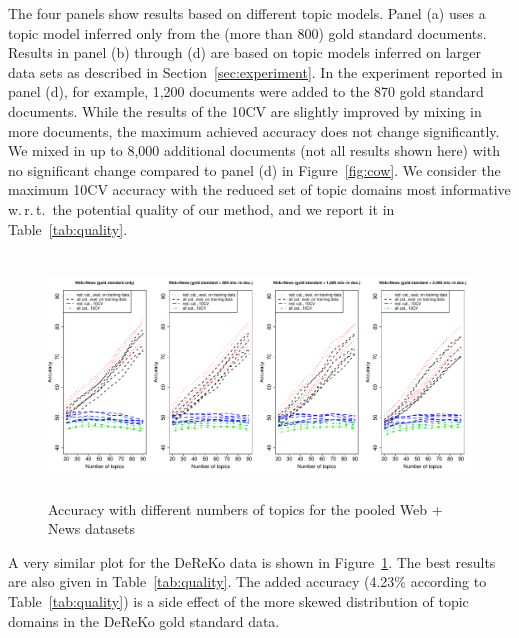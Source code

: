 \documentclass[11pt]{article}
\begin{document}
The four panels show results based on different topic models.
Panel (a) uses a topic model inferred only from the (more than 800) gold standard documents.
Results in panel (b) through (d) are based on topic models inferred on larger data sets as described in Section~\ref{sec:experiment}.
In the experiment reported in panel (d), for example, 1,200 documents were added to the 870 gold standard documents.
While the results of the 10CV are slightly improved by mixing in more documents, the maximum achieved accuracy does not change significantly.
We mixed in up to 8,000 additional documents (not all results shown here) with no significant change compared to panel (d) in Figure~\ref{fig:cow}.
We consider the maximum 10CV accuracy with the reduced set of topic domains most informative w.\,r.\,t.\ the potential quality of our method, and we report it in Table~\ref{tab:quality}.


\begin{figure}[!ht]
  \centering
  \includegraphics[width=\textwidth, height=6.4cm]{graphics/coreko.pdf}
  \caption{Accuracy with different numbers of topics for the pooled Web + News datasets}
  \label{fig:coreko}
\end{figure}

A very similar plot for the DeReKo data is shown in Figure~\ref{fig:coreko}.
The best results are also given in Table~\ref{tab:quality}.
The added accuracy (4.23\% according to Table~\ref{tab:quality}) is a side effect of the more skewed distribution of topic domains in the DeReKo gold standard data.
\end{document}
